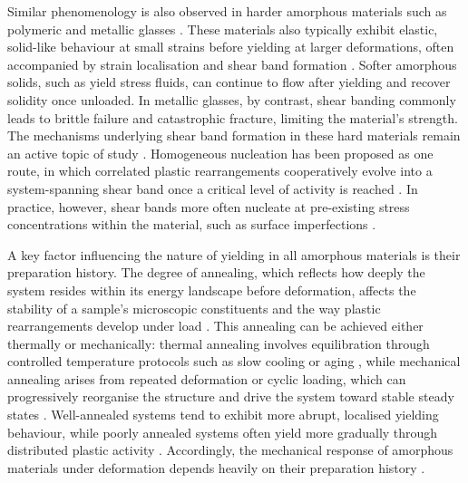 Similar phenomenology is also observed in harder amorphous materials such as polymeric and metallic glasses \cite{hufnagel_deformation_2016,chen_mechanical_2008,boyce_large_1988,anand_large-deformation_2012,Argon1979}. These materials also typically exhibit elastic, solid-like behaviour at small strains before yielding at larger deformations, often accompanied by strain localisation and shear band formation \cite{greer_shear_2013,Maa2015}. Softer amorphous solids, such as yield stress fluids, can continue to flow after yielding and recover solidity once unloaded. In metallic glasses, by contrast, shear banding commonly leads to brittle failure and catastrophic fracture, limiting the material’s strength. The mechanisms underlying shear band formation in these hard materials remain an active topic of study \cite{greer_shear_2013,Cheng2011,Shi2006}. Homogeneous nucleation has been proposed as one route, in which correlated plastic rearrangements cooperatively evolve into a system-spanning shear band once a critical level of activity is reached \cite{Shi2006}. In practice, however, shear bands more often nucleate at pre-existing stress concentrations within the material, such as surface imperfections \cite{Vasoya2016,Shi2007}.

A key factor influencing the nature of yielding in all amorphous materials is their preparation history. The degree of annealing, which reflects how deeply the system resides within its energy landscape before deformation, affects the stability of a sample's microscopic constituents and the way plastic rearrangements develop under load \cite{Shi2005,Ozawa2018}. This annealing can be achieved either thermally or mechanically: thermal annealing involves equilibration through controlled temperature protocols such as slow cooling or aging \cite{yehGlassStabilityChanges2020,kumarMappingOutGlassy2022,mfielding_shear_2009,cochran_slow_2024}, while mechanical annealing arises from repeated deformation or cyclic loading, which can progressively reorganise the structure and drive the system toward stable steady states \cite{bhaumikRoleAnnealingDetermining2021,priezjevMolecularDynamicsSimulations2018,khandareElastoplasticModellingCyclic2026}. Well-annealed systems tend to exhibit more abrupt, localised yielding behaviour, while poorly annealed systems often yield more gradually through distributed plastic activity \cite{Leishangthem2017,Popovi2018,barlow_ductile_2020}. Accordingly, the mechanical response of amorphous materials under deformation depends heavily on their preparation history \cite{Shi2005,Ozawa2018,Vasisht2020,barlow_ductile_2020,Leishangthem2017,Popovi2018,nicolas_deformation_2018,SCHUH2007,Berthier2025}.

